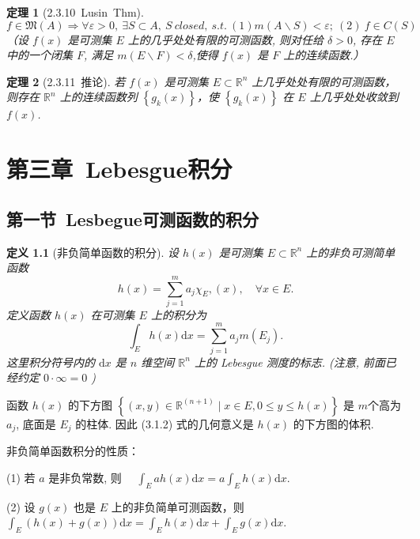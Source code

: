 \documentclass[10pt,openany]{book}
\theoremstyle{thmstyle} %
\newtheorem{theorem}{定理}[chapter]
\theoremstyle{defstyle} %
\newtheorem{definition}[theorem]{定义}
\theoremstyle{prostyle} %
\begin{document}
\begin{theorem}[2.3.10~Lusin~Thm]
\begin{equation}
f \in \mathfrak{M}(A) \Rightarrow \forall \varepsilon>0,~ \exists S \subset A, ~ S ~ closed, ~ s.t. ~ (1)m(A\backslash S)<\varepsilon; ~(2)~ f \in C(S)
\end{equation}
（设 $f(x)$ 是可测集 $E$ 上的几乎处处有限的可测函数, 则对任给 $\delta>0$, 存在 $E$ 中的一个闭集 $F$, 满足 $m(E \backslash F)<\delta$,使得 $f(x)$ 是 $F$ 上的连续函数.）
\end{theorem}

\begin{theorem}[2.3.11~推论]
若 $f(x)$ 是可测集 $E \subset \mathbb{R}^n$ 上几乎处处有限的可测函数，则存在 $\mathbb{R}^n$ 上的连续函数列 $\left\{ g_k(x) \right\}$，使 $\left\{ g_k(x) \right\}$ 在 $E$ 上几乎处处收敛到 $f(x)$.
\end{theorem}




\chapter{第三章~Lebesgue积分}

\section{第一节~Lesbegue可测函数的积分}

\begin{definition}[非负简单函数的积分]
设 $h(x)$ 是可测集 $E \subset \mathbb{R}^n$ 上的非负可测简单函数
$$
h(x)=\sum_{j=1}^m a_j \chi_E,(x), \quad \forall x \in E .
$$
定义函数 $h(x)$ 在可测集 $E$ 上的积分为
$$
\int_E h(x) \mathrm{d} x=\sum_{j=1}^m a_j m\left(E_j\right) .
$$
这里积分符号内的 $\mathrm{d} x$ 是 $n$ 维空间 $\mathbb{R}^n$ 上的 Lebesgue 测度的标志. (注意, 前面已经约定 $0 \cdot \infty=0$ )
\end{definition}

函数 $h(x)$ 的下方图 $\left\{(x, y) \in \mathbb{R}^{(n+1)} \mid x \in E, 0 \leq y \leq h(x)\right\}$ 是 $m$个高为 $a_j$, 底面是 $E_j$ 的柱体. 因此 (3.1.2) 式的几何意义是 $h(x)$ 的下方图的体积.

\vspace{0.4cm}

非负简单函数积分的性质：

(1) 若 $a$ 是非负常数, 则 $\quad \int_E a h(x) \mathrm{d} x=a \int_E h(x) \mathrm{d} x$.

(2) 设 $g(x)$ 也是 $E$ 上的非负简单可测函数，则 $\int_E(h(x)+g(x)) \mathrm{d} x=\int_E h(x) \mathrm{d} x+\int_E g(x) \mathrm{d} x$.
\end{document}
